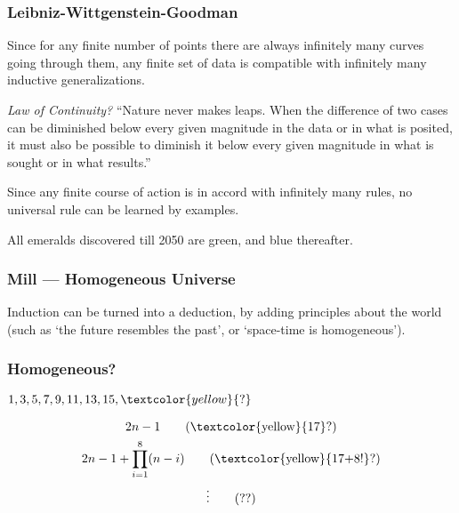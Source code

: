 \documentclass[UTF8,11pt,colorlinks,compress,openany]{beamer}%
\begin{document}
\begin{frame}\frametitle{Leibniz-Wittgenstein-Goodman}
	\begin{proposition}[Leibniz]
		Since for any finite number of points there are always infinitely many curves going through them, any finite set of data is compatible with infinitely many inductive generalizations. 
	\end{proposition}
	\emph{Law of Continuity?} ``Nature never makes leaps. When the difference of two cases can be diminished below every given magnitude in the data or in what is posited, it must also be possible to diminish it below every given magnitude in what is sought or in what results.''
	\begin{proposition}[Wittgenstein]
		Since any finite course of action is in accord with infinitely many rules, no universal rule can be learned by examples.
	\end{proposition}
	\begin{proposition}[Goodman]
		All emeralds discovered till 2050 are green, and blue thereafter. 
	\end{proposition}
\end{frame}

\begin{frame}\frametitle{Mill --- Homogeneous Universe}
	\begin{proposition}[Mill]
		Induction can be turned into a deduction, by adding principles about the world (such as `the future resembles the past', or `space-time is homogeneous').
	\end{proposition}
\end{frame}

\begin{frame}\frametitle{Homogeneous?}
	\begin{problem}
		$1,3,5,7,9,11,13,15,\textcolor{yellow}{\mathbf{?}}$
	\end{problem}
	\begin{solution}
		\begin{gather}
		2n-1\tag{\textcolor{yellow}{17}?}\\
		2n-1+\prod\limits_{i=1}^8(n-i)\tag{\textcolor{yellow}{17+8!}?}\\
		\vdots \tag{??}
		\end{gather}
	\end{solution}
\end{frame}
\end{document}
